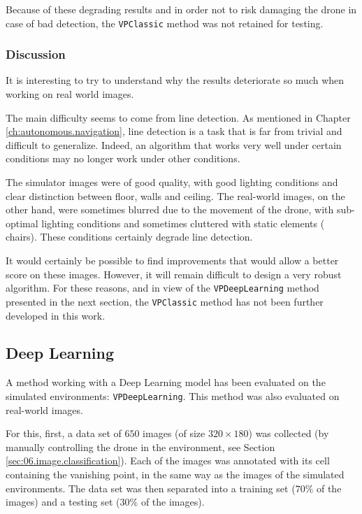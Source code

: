 Because of these degrading results and in order not to risk damaging the drone in case of bad detection, the \texttt{VPClassic} method was not retained for testing.

\subsubsection{Discussion}

It is interesting to try to understand why the results deteriorate so much when working on real world images.

The main difficulty seems to come from line detection. As mentioned in Chapter \ref{ch:autonomous.navigation}, line detection is a task that is far from trivial and difficult to generalize. Indeed, an algorithm that works very well under certain conditions may no longer work under other conditions.

The simulator images were of good quality, with good lighting conditions and clear distinction between floor, walls and ceiling. The real-world images, on the other hand, were sometimes blurred due to the movement of the drone, with sub-optimal lighting conditions and sometimes cluttered with static elements (\eg{} chairs). These conditions certainly degrade line detection.

\begin{note}
    It would certainly be possible to find improvements that would allow a better score on these images. However, it will remain difficult to design a very robust algorithm. For these reasons, and in view of the \texttt{VPDeepLearning} method presented in the next section, the \texttt{VPClassic} method has not been further developed in this work.
\end{note}

\subsection{Deep Learning}

A method working with a Deep Learning model has been evaluated on the simulated environments: \texttt{VPDeepLearning}. This method was also evaluated on real-world images.

For this, first, a data set of $\num{650}$ images (of size $\num{320} \times \num{180}$) was collected (by manually controlling the drone in the environment, see Section \ref{sec:06.image.classification}). Each of the images was annotated with its cell containing the vanishing point, in the same way as the images of the simulated environments. The data set was then separated into a training set ($\num{70}\%$ of the images) and a testing set ($\num{30}\%$ of the images).

